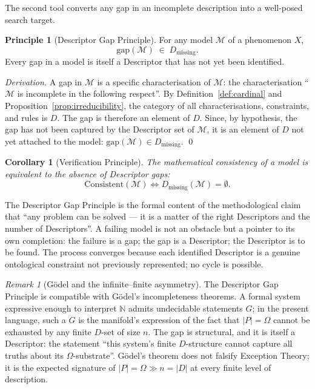 \documentclass[11pt,a4paper]{article}
\newtheorem{corollary}[theorem]{Corollary}
\theoremstyle{definition}
\newtheorem{principle}[theorem]{Principle}
\theoremstyle{remark}
\newtheorem{remark}[theorem]{Remark}
\begin{document}
The second tool converts any gap in an incomplete description into a well-posed search target.

\begin{principle}[Descriptor Gap Principle]\label{princ:descriptor-gap}
For any model $\mathcal{M}$ of a phenomenon $X$,
\[
\boxed{\;\mathrm{gap}(\mathcal{M}) \;\in\; D_{\mathrm{missing}}.\;}
\]
Every gap in a model is itself a Descriptor that has not yet been identified.
\end{principle}

\begin{proof}[Derivation]
A gap in $\mathcal{M}$ is a specific characterisation of $\mathcal{M}$: the characterisation ``$\mathcal{M}$ is incomplete in the following respect''. By Definition~\ref{def:cardinal} and Proposition~\ref{prop:irreducibility}, the category of all characterisations, constraints, and rules is $D$. The gap is therefore an element of $D$. Since, by hypothesis, the gap has not been captured by the Descriptor set of $\mathcal{M}$, it is an element of $D$ not yet attached to the model: $\mathrm{gap}(\mathcal{M})\in D_{\mathrm{missing}}$. \qed
\end{proof}

\begin{corollary}[Verification Principle]\label{cor:verification}
The mathematical consistency of a model is equivalent to the absence of Descriptor gaps:
\[
\mathrm{Consistent}(\mathcal{M}) \iff D_{\mathrm{missing}}(\mathcal{M}) = \emptyset.
\]
\end{corollary}

The Descriptor Gap Principle is the formal content of the methodological claim that ``any problem can be solved --- it is a matter of the right Descriptors and the number of Descriptors''. A failing model is not an obstacle but a pointer to its own completion: the failure is a gap; the gap is a Descriptor; the Descriptor is to be found. The process converges because each identified Descriptor is a genuine ontological constraint not previously represented; no cycle is possible.

\begin{remark}[Gödel and the infinite--finite asymmetry]\label{rem:godel-asymmetry}
The Descriptor Gap Principle is compatible with Gödel's incompleteness theorems. A formal system expressive enough to interpret $\mathbb{N}$ admits undecidable statements $G$; in the present language, such a $G$ is the manifold's expression of the fact that $|P|=\Omega$ cannot be exhausted by any finite $D$-set of size $n$. The gap is structural, and it is itself a Descriptor: the statement ``this system's finite $D$-structure cannot capture all truths about its $\Omega$-substrate''. Gödel's theorem does not falsify Exception Theory; it is the expected signature of $|P|=\Omega \gg n = |D|$ at every finite level of description.
\end{remark}
\end{document}
